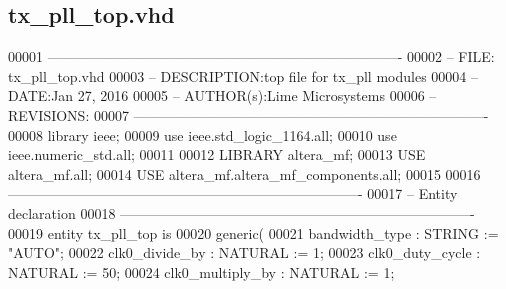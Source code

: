 \subsection{tx\+\_\+pll\+\_\+top.\+vhd}
\label{tx__pll__top_8vhd_source}

\begin{DoxyCode}
00001 \textcolor{keyword}{----------------------------------------------------------------------------}
00002 \textcolor{keyword}{-- FILE: tx\_pll\_top.vhd}
00003 \textcolor{keyword}{-- DESCRIPTION:top file for tx\_pll modules}
00004 \textcolor{keyword}{-- DATE:Jan 27, 2016}
00005 \textcolor{keyword}{-- AUTHOR(s):Lime Microsystems}
00006 \textcolor{keyword}{-- REVISIONS:}
00007 \textcolor{keyword}{----------------------------------------------------------------------------}
00008 \textcolor{vhdlkeyword}{library }\textcolor{keywordflow}{ieee};
00009 \textcolor{vhdlkeyword}{use }ieee.std\_logic\_1164.\textcolor{keywordflow}{all};
00010 \textcolor{vhdlkeyword}{use }ieee.numeric\_std.\textcolor{keywordflow}{all};
00011 
00012 \textcolor{vhdlkeyword}{LIBRARY }\textcolor{keywordflow}{altera\_mf};
00013 \textcolor{vhdlkeyword}{USE }\textcolor{keywordflow}{altera\_mf.all};
00014 \textcolor{vhdlkeyword}{USE }altera\_mf.altera\_mf\_components.\textcolor{keywordflow}{all};
00015 
00016 \textcolor{keyword}{----------------------------------------------------------------------------}
00017 \textcolor{keyword}{-- Entity declaration}
00018 \textcolor{keyword}{----------------------------------------------------------------------------}
00019 \textcolor{keywordflow}{entity }tx_pll_top \textcolor{keywordflow}{is}
00020    \textcolor{keywordflow}{generic}\textcolor{vhdlchar}{(}
00021       \textcolor{vhdlchar}{bandwidth_type}          \textcolor{vhdlchar}{:} \textcolor{comment}{STRING}    \textcolor{vhdlchar}{:=} \textcolor{keyword}{"AUTO"};
00022       \textcolor{vhdlchar}{clk0_divide_by}          \textcolor{vhdlchar}{:} \textcolor{comment}{NATURAL}   \textcolor{vhdlchar}{:=} \textcolor{vhdllogic}{}\textcolor{vhdllogic}{1};
00023       \textcolor{vhdlchar}{clk0_duty_cycle}         \textcolor{vhdlchar}{:} \textcolor{comment}{NATURAL}   \textcolor{vhdlchar}{:=} \textcolor{vhdllogic}{}\textcolor{vhdllogic}{50};
00024       \textcolor{vhdlchar}{clk0_multiply_by}        \textcolor{vhdlchar}{:} \textcolor{comment}{NATURAL}   \textcolor{vhdlchar}{:=} \textcolor{vhdllogic}{}\textcolor{vhdllogic}{1};

\end{DoxyCode}
